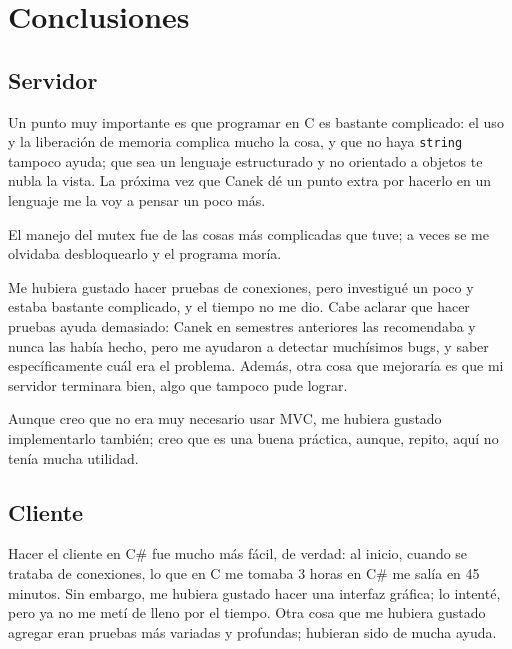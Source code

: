 \documentclass{article}
\begin{document}
\section{Conclusiones}
\label{sec:conclusiones}
\subsection{Servidor}
Un punto muy importante es que programar en C es bastante complicado: el uso y
la liberación de memoria complica mucho la cosa, y que no haya \texttt{string}
tampoco ayuda; que sea un lenguaje estructurado y no orientado a objetos te
nubla la vista. La próxima vez que Canek dé un punto extra por hacerlo en un
lenguaje me la voy a pensar un poco más.

El manejo del mutex fue de las cosas más complicadas que tuve; a veces se me
olvidaba desbloquearlo y el programa moría.

Me hubiera gustado hacer pruebas de conexiones, pero investigué un poco y
estaba bastante complicado, y el tiempo no me dio. Cabe aclarar que hacer
pruebas ayuda demasiado: Canek en semestres anteriores las recomendaba y nunca
las había hecho, pero me ayudaron a detectar muchísimos bugs, y saber
específicamente cuál era el problema. Además, otra cosa que
mejoraría es que mi servidor terminara bien, algo que tampoco pude lograr.

Aunque creo que no era muy necesario usar MVC, me hubiera gustado
implementarlo también; creo que es una buena práctica, aunque, repito, aquí no
tenía mucha utilidad.

\subsection{Cliente}
Hacer el cliente en C\# fue mucho más fácil, de verdad: al inicio, cuando se
trataba de conexiones, lo que en C me tomaba 3 horas en C\# me salía en 45
minutos. Sin embargo, me hubiera gustado hacer una interfaz gráfica; lo
intenté, pero ya no me metí de lleno por el tiempo. Otra cosa que me hubiera
gustado agregar eran pruebas más variadas y profundas; hubieran sido de mucha
ayuda.
    

\end{document}
